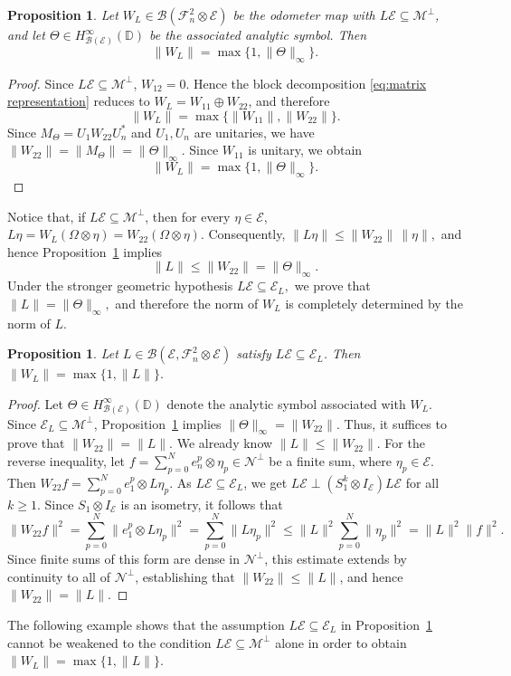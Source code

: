 \documentclass[12pt]{amsart}
\newtheorem{proposition}[theorem]{Proposition}
\theoremstyle{definition}
\theoremstyle{remark}
\def \D{\mathbb{D}}
\newcommand{\clb}{\mathcal{B}}
\newcommand{\cle}{\mathcal{E}}
\newcommand{\clm}{\mathcal{M}}
\newcommand{\cln}{\mathcal{N}}
\newcommand{\clf}{\mathcal{F}}
\numberwithin{equation}{section}
\begin{document}
\begin{proposition}
\label{normWL}
Let $W_L \in \clb(\clf_n^2 \otimes \cle)$ be the odometer map with $L\cle \subseteq \clm^\perp$, and let $\Theta
\in H^\infty_{\clb(\cle)}(\D)$
be the associated analytic symbol. Then
\[
\|W_L\| = \max\{1,\|\Theta\|_{\infty}\}.
\]
\end{proposition}

\begin{proof}
Since $L\cle \subseteq \clm^\perp$, $W_{12}=0.$
Hence the block decomposition \eqref{eq:matrix representation} reduces to $W_L=
W_{11} \oplus W_{22}$,
and therefore
\[
\|W_L\|=\max\{\|W_{11}\|,\|W_{22}\|\}.
\]
Since \(M_\Theta=U_1W_{22}U_n^*\) and \(U_1,U_n\) are unitaries, we have
$\|W_{22}\|=\|M_\Theta\|=\|\Theta\|_{\infty}.$
Since $W_{11}$ is unitary, we obtain
\[
\|W_L\|
=
\max\{1,\|\Theta\|_{\infty}\}.
\]
\end{proof}
Notice that, if $L\cle \subseteq \clm^\perp$, then for every $\eta\in\cle$, $L\eta
=
W_L(\Omega\otimes \eta)
=
W_{22}(\Omega\otimes \eta).$
Consequently, $\|L\eta\|
\leq
\|W_{22}\|\,\|\eta\|,$
and hence Proposition~\ref{normWL} implies
\[
\|L\|
\leq \|W_{22}\|=
\|\Theta\|_\infty.
\]
Under the stronger geometric hypothesis $L\cle \subseteq \cle_L,$ we prove that $\|L\|=\|\Theta\|_\infty,$
and therefore the norm of $W_L$ is completely determined by the norm of $L$.


\begin{proposition} \label{prop:norm_theta_L}
Let \(L\in\clb(\cle,\clf_n^2\otimes\cle)\) satisfy \(L\cle\subseteq\cle_L\).
Then
$\|W_L\|=\max\{1,\|L\|\}.$
\end{proposition}

\begin{proof}
Let $\Theta \in H^\infty_{\clb(\cle)}(\D)$ denote the analytic symbol associated with $W_L$. Since $\cle_L \subseteq \clm^\perp$, Proposition~\ref{normWL} implies  $\|\Theta\|_\infty=\|W_{22}\|$. Thus, it suffices to prove that $\|W_{22}\| = \|L\|$. We already know $ \|L\| \leq \|W_{22}\|$. For the reverse inequality, let $f = \sum_{p=0}^N e_n^{ p}\otimes \eta_p \in \cln^\perp$ be a finite sum, where $\eta_p \in \cle$. Then $W_{22}f = \sum_{p=0}^N e_1^{ p}\otimes L\eta_p.$
As $L\cle \subseteq \cle_L$, we get $L\cle \perp (S_1^k \otimes I_\cle)L\cle$ for all $k \ge 1$. Since \(S_1\otimes I_\cle\) is an isometry, it follows that
\[
\|W_{22}f\|^2
=
\sum_{p=0}^N \|e_1^{p} \otimes L\eta_p\|^2
=
\sum_{p=0}^N \|L\eta_p\|^2
\le
\|L\|^2 \sum_{p=0}^N \|\eta_p\|^2
=
\|L\|^2 \|f\|^2.
\]
Since finite sums of this form are dense in $\cln^\perp$, this estimate extends by continuity to all of $\cln^\perp$, establishing that $\|W_{22}\| \le \|L\|$, and hence $\|W_{22}\| = \|L\|$.
\end{proof}
The following example shows that the assumption 
$L\cle \subseteq \cle_L$ in Proposition~\ref{prop:norm_theta_L}
cannot be weakened to the condition 
$L\cle \subseteq \clm^\perp$ alone in order to obtain $\|W_L\|=\max\{1,\|L\|\}.$
\end{document}
